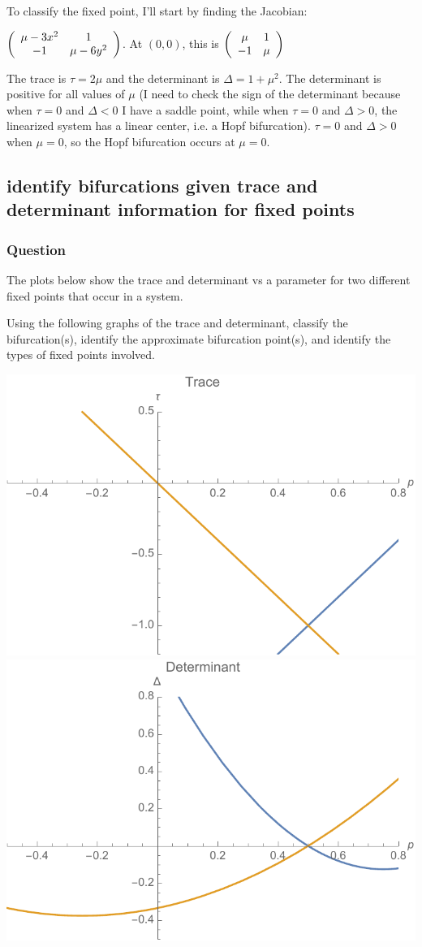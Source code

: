 \documentclass[12pt,letterpaper,noanswers]{exam}
\begin{document}
To classify the fixed point, I'll start by finding the Jacobian:

$\left(\begin{array}{c c} \mu - 3x^2 & 1 \\ -1 & \mu - 6y^2  \end{array}\right)$. At $(0,0)$, this is $\left(\begin{array}{c c} \mu  & 1 \\ -1 & \mu  \end{array}\right)$

The trace is $\tau = 2\mu$ and the determinant is $\Delta = 1+\mu^2$.  The determinant is positive for all values of $\mu$ (I need to check the sign of the determinant because when $\tau = 0$ and $\Delta < 0$ I have a saddle point, while when $\tau = 0$ and $\Delta > 0$, the linearized system has a linear center, i.e. a Hopf bifurcation).  $\tau = 0$ and $\Delta>0$ when $\mu = 0$, so the Hopf bifurcation occurs at $\mu = 0$. 


\subsection{identify bifurcations given trace and determinant information for fixed points}
\subsubsection{Question}
The plots below show the trace and determinant vs a parameter for two different fixed points that occur in a system.

Using the following graphs of the trace and determinant, classify the bifurcation(s),  identify the approximate bifurcation point(s), and identify the types of fixed points involved.

\includegraphics[width=0.4\linewidth]{img/C19-20p1a.pdf}
\includegraphics[width=0.4\linewidth]{img/C19-20p1b.pdf}
\end{document}
